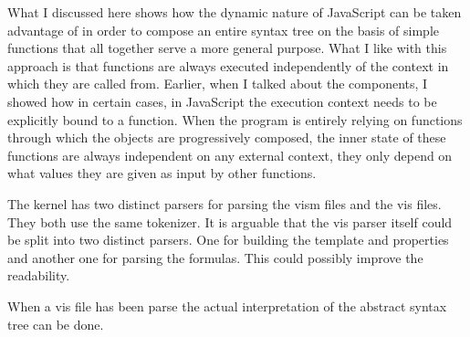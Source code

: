 What I discussed here shows how the dynamic nature of JavaScript can be taken advantage of in order to compose an entire syntax tree on the basis of simple functions that all together serve a more general purpose. What I like with this approach is that functions are always executed independently of the context in which they are called from. Earlier, when I talked about the components, I showed how in certain cases, in JavaScript the execution context needs to be explicitly bound to a function. When the program is entirely relying on functions through which the objects are progressively composed, the inner state of these functions are always independent on any external context, they only depend on what values they are given as input by other functions.

The kernel has two distinct parsers for parsing the vism files and the vis files. They both use the same tokenizer. It is arguable that the vis parser itself could be split into two distinct parsers. One for building the template and properties and another one for parsing the formulas. This could possibly improve the readability.

When a vis file has been parse the actual interpretation of the abstract syntax tree can be done.
